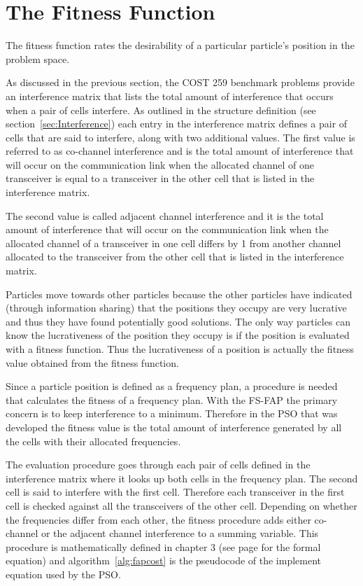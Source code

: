 \section{The Fitness Function}
The fitness function rates the desirability of a particular particle's position in the problem space.

As discussed in the previous section, the COST 259 benchmark problems provide an interference matrix that lists the total amount of interference that occurs when a pair of cells interfere. As outlined in the structure definition (see section~\ref{sec:Interference}) each entry in the interference matrix defines a pair of cells that are said to interfere, along with two additional values. The first value is referred to as co-channel interference and is the total amount of interference that will occur on the communication link when the allocated channel of one transceiver is equal to a transceiver in the other cell that is listed in the interference matrix. 

The second value is called adjacent channel interference and it is the total amount of interference that will occur on the communication link when the allocated channel of a transceiver in one cell differs by 1 from another channel allocated to the transceiver from the other cell that is listed in the interference matrix.

Particles move towards other particles because the other particles have indicated (through information sharing) that the positions they occupy are very lucrative and thus they have found potentially good solutions. The only way particles can know the lucrativeness of the position they occupy is if the position is evaluated with a fitness function. Thus the lucrativeness of a position is actually the fitness value obtained from the fitness function. 

Since a particle position is defined as a frequency plan, a procedure is needed that calculates the fitness of a frequency plan. With the FS-FAP the primary concern is to keep interference to a minimum. Therefore in the PSO that was developed the fitness value is the total amount of interference generated by all the cells with their allocated frequencies. 

The evaluation procedure goes through each pair of cells defined in the interference matrix where it looks up both cells in the frequency plan. The second cell is said to interfere with the first cell. Therefore each transceiver in the first cell is checked against all the transceivers of the other cell. Depending on whether the frequencies differ from each other, the fitness procedure adds either co-channel or the adjacent channel interference to a summing variable. This procedure is mathematically defined in chapter 3 (see page \pageref{E:costFunction} for the formal equation) and algorithm~\ref{alg:fapcost} is the pseudocode of the implement equation used by the PSO. 

